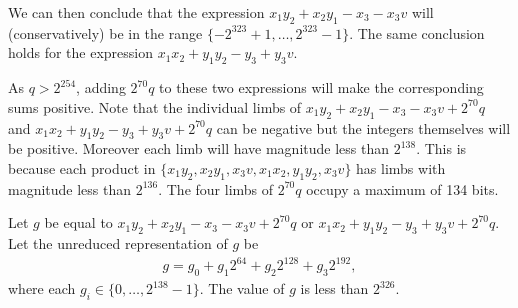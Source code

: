 \documentclass[a4paper, 12pt]{article}
\begin{document}
We can then conclude that the expression $x_1y_2+x_2y_1-x_3-x_3v$ will (conservatively) be in the range $\{-2^{323}+1,\ldots,2^{323}-1\}$. The same conclusion holds for the expression $x_1x_2 + y_1y_2 -y_3 + y_3 v$.

As $q > 2^{254}$, adding $2^{70}q$ to these two expressions will make the corresponding sums positive. Note that the individual limbs of $x_1y_2+x_2y_1-x_3-x_3v + 2^{70}q$ and $x_1x_2 + y_1y_2 -y_3 + y_3 v + 2^{70}q$ can be negative but the integers themselves will be positive. Moreover each limb will have magnitude less than $2^{138}$. This is because each product in $\{x_1y_2, x_2y_1, x_3v, x_1x_2, y_1y_2, x_3v\}$ has limbs with magnitude less than $2^{136}$. The four limbs of $2^{70}q$ occupy a maximum of 134 bits.


Let $g$ be equal to $x_1y_2+x_2y_1-x_3-x_3v + 2^{70}q$ or $x_1x_2 + y_1y_2 -y_3 + y_3 v + 2^{70}q$. Let the unreduced representation of $g$ be
\begin{align*}
  g = g_0 + g_1 2^{64} + g_2 2^{128} + g_3 2^{192},
\end{align*}
where each $g_i \in \{0,\ldots,2^{138}-1\}$. The value of $g$ is less than $2^{326}$.
\end{document}
